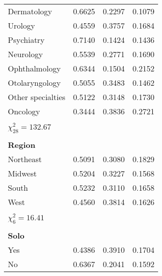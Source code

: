 \begin{table}[h]
\begin{tabular}{@{}llll@{}}
Dermatology                            & 0.6625   & 0.2297     & 0.1079     \\
Urology                                & 0.4559   & 0.3757     & 0.1684     \\
Psychiatry                             & 0.7140   & 0.1424     & 0.1436     \\
Neurology                              & 0.5539   & 0.2771     & 0.1690     \\
Ophthalmology                          & 0.6344   & 0.1504     & 0.2152     \\
Otolaryngology                         & 0.5055   & 0.3483     & 0.1462     \\
Other specialties                      & 0.5122   & 0.3148     & 0.1730     \\
Oncology                               & 0.3444   & 0.3836     & 0.2721     \\
                                       &          &            &            \\
$\chi^2_{28} = 132.67$                 &          &            &            \\
                                       &          &            &            \\
\textbf{Region}                        &          &            &            \\
Northeast                              & 0.5091   & 0.3080     & 0.1829     \\
Midwest                                & 0.5204   & 0.3227     & 0.1568     \\
South                                  & 0.5232   & 0.3110     & 0.1658     \\
West                                   & 0.4560   & 0.3814     & 0.1626     \\
                                       &          &            &            \\
$\chi^2_6 = 16.41$                     &          &            &            \\
                                       &          &            &            \\
\textbf{Solo}                          &          &            &            \\
Yes                                    & 0.4386   & 0.3910     & 0.1704     \\
No                                     & 0.6367   & 0.2041     & 0.1592     \\

\end{tabular}
\end{table}
